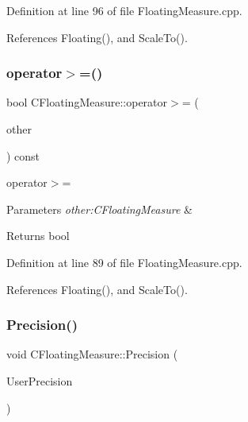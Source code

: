 Definition at line 96 of file Floating\+Measure.\+cpp.



References Floating(), and Scale\+To().

\mbox{\label{classCFloatingMeasure_aa6575f6f658ee524da9e5f123189cef1}} 
\subsubsection{\texorpdfstring{operator$>$=()}{operator>=()}}
{\footnotesize\ttfamily bool C\+Floating\+Measure\+::operator$>$= (\begin{DoxyParamCaption}\item[{const \hyperlink{classCFloatingMeasure}{C\+Floating\+Measure} \&}]{other }\end{DoxyParamCaption}) const}



operator$>$= 


\begin{DoxyParams}{Parameters}
{\em other\+:\+C\+Floating\+Measure} & \\
\hline
\end{DoxyParams}
\begin{DoxyReturn}{Returns}
bool 
\end{DoxyReturn}


Definition at line 89 of file Floating\+Measure.\+cpp.



References Floating(), and Scale\+To().

\mbox{\label{classCFloatingMeasure_abaedeff78fb7009c788df5a016bc46d5}} 
\subsubsection{\texorpdfstring{Precision()}{Precision()}\hspace{0.1cm}{\footnotesize\ttfamily [1/2]}}
{\footnotesize\ttfamily void C\+Floating\+Measure\+::\+Precision (\begin{DoxyParamCaption}\item[{const \hyperlink{classCFloatingMeasure}{C\+Floating\+Measure} \&}]{User\+Precision }\end{DoxyParamCaption})}



